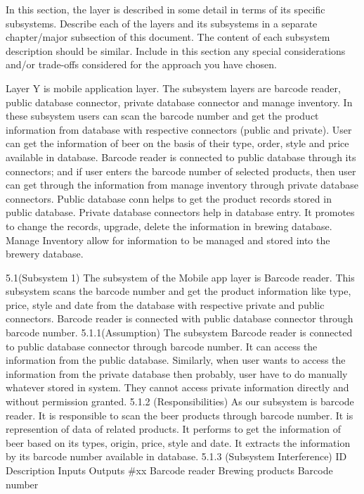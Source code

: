 In this section, the layer is described in some detail in terms of its specific subsystems. Describe each of the layers and its subsystems in a separate chapter/major subsection of this document. The content of each subsystem description should be similar. Include in this section any special considerations and/or trade-offs considered for the approach you have chosen.

Layer Y is mobile application layer. The subsystem layers are barcode reader, public database connector, private database connector and manage inventory. In these subsystem users can scan the barcode number and get the product information from database with respective connectors (public and private). User can get the information of beer on the basis of their type, order, style and price available in database.  Barcode reader is connected to public database through its connectors; and if user enters the barcode number of selected products, then user can get through the information from manage inventory through private database connectors. Public database conn helps to get the product records stored in public database. Private database connectors help in database entry. It promotes to change the records, upgrade, delete the information in brewing database. Manage Inventory allow for information to be managed and stored into the brewery database.

5.1(Subsystem 1)
The subsystem of the Mobile app layer is Barcode reader. This subsystem scans the barcode number and get the product information like type, price, style and date from the database with respective private and public connectors. Barcode reader is connected with public database connector through barcode number. 
5.1.1(Assumption)
The subsystem Barcode reader is connected to public database connector through barcode number. It can access the information from the public database. Similarly, when user wants to access the information from the private database then probably, user have to do manually whatever stored in system. They cannot access private information directly and without permission granted.
5.1.2
(Responsibilities)
As our subsystem is barcode reader. It is responsible to scan the beer products through barcode number. It is represention of data of related products. It performs to get the information of beer based on its types, origin, price, style and date. It extracts the information by its barcode number available in database.
 5.1.3 (Subsystem Interference)
ID 	Description 	Inputs 	Outputs 
#xx 	Barcode reader	 Brewing products	Barcode number 



